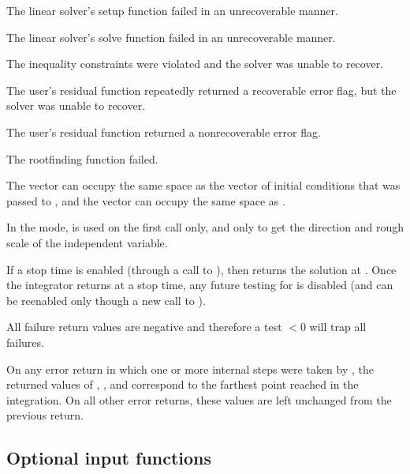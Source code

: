 {{\begin{args}
  \item[\Id{IDA\_LSETUP\_FAIL}]
    The linear solver's setup function failed in an unrecoverable manner.
  \item[\Id{IDA\_LSOLVE\_FAIL}]
    The linear solver's solve function failed in an unrecoverable manner.
  \item[\Id{IDA\_CONSTR\_FAIL}]
    The inequality constraints were violated and the solver was unable
    to recover.
  \item[\Id{IDA\_REP\_RES\_ERR}]
    The user's residual function repeatedly returned a recoverable error
    flag, but the solver was unable to recover.
  \item[\Id{IDA\_RES\_FAIL}]
    The user's residual function returned a nonrecoverable error flag.
  \item[\Id{IDA\_RTFUNC\_FAIL}]
    The rootfinding function failed.
  \end{args}
}
{
  The vector  can occupy the same space as the vector  of
  initial conditions that was passed to , and the
  vector  can occupy the same space as .

  In the  mode,  is used on the first call only,
  and only to get the direction and rough scale of the independent variable.

  If a stop time is enabled (through a call to ), then
   returns the solution at . Once the integrator returns
  at a stop time, any future testing for  is disabled (and can be
  reenabled only though a new call to ).

  All failure return values are negative and therefore a test  $< 0$
  will trap all  failures.

  On any error return in which one or more internal steps were taken by
  , the returned values of , , and 
  correspond to the farthest point reached in the integration.
  On all other error returns, these values are left unchanged from the
  previous  return.
}



\subsection{Optional input functions}\label{ss:optional_input}

}

